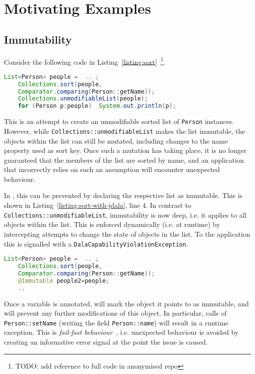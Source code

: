 \section{Motivating Examples}

\subsection{Immutability}	


Consider the following code in Listing~\ref{listing:sort}~\footnote{TODO: add reference to full code in anonymised repo}.

\begin{lstlisting}[language=Java, caption=Erroneous Attempt to Make a Sorted List Immutable, label=listing:sort]
	List<Person> people =  .. ;
	Collections.sort(people,
	Comparator.comparing(Person::getName));
	Collections.unmodifiableList(people);
	for (Person p:people)  System.out.println(p);
\end{lstlisting}

This is an attempt to create an unmodifiable sorted list of \texttt{Person} instances. 
However, while \texttt{Collections::unmodifiableList} makes the list immutable, the objects within the list can still be mutated, including changes to the name property used as sort key.  Once such a mutation 
has taking place, it is no longer guaranteed that the members of the list are sorted by name, and an application that incorrectly relies on such an assumption will encounter unexpected behaviour.

In \jdala ,  this can be prevented by declaring the respective list as immutable. This is shown in Listing~\ref{listing:sort-with-jdala}, line 4. In contrast to \texttt{Collections::unmodifiableList}, immutability is now deep, i.e. it applies to all objects within the list. This is enforced dynamically (i.e. at runtime) by intercepting attempts to change the state of objects in the list.  To the application this is signalled with a \texttt{DalaCapabilityViolationException}. 

\begin{lstlisting}[language=Java, caption=Make a Sorted List Immutable with \jdala, label=listing:sort-with-jdala]
	List<Person> people =  .. ;
	Collections.sort(people,
	Comparator.comparing(Person::getName));
	@Immutable people2=people;
	..
\end{lstlisting}

Once a variable is annotated, \jdala will mark the object it points to as immutable, and will prevent any further modifications of this object. 
In particular, calls of \texttt{Person::setName} (writing the field \texttt{Person::name}) will result in a runtime exception. 
This is \textit{fail-fast behaviour}~\cite{shore2004fail}, i.e. unexpected behaviour is avoided by creating an informative error signal at the point the issue is caused. 

